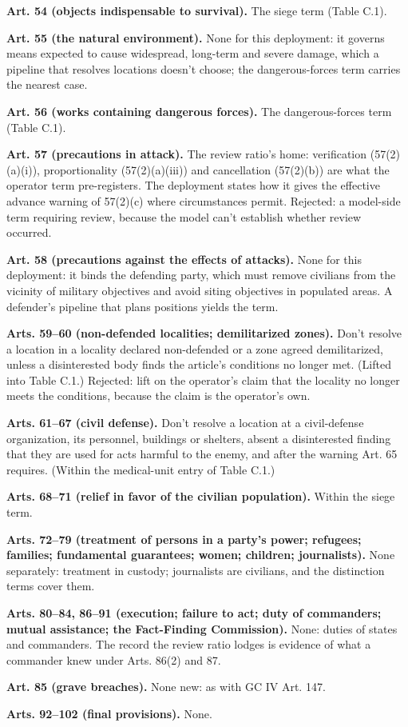 \textbf{Art. 54 (objects indispensable to survival).} The siege term (Table C.1).

\textbf{Art. 55 (the natural environment).} None for this deployment: it governs means expected to cause widespread, long-term and severe damage, which a pipeline that resolves locations doesn't choose; the dangerous-forces term carries the nearest case.

\textbf{Art. 56 (works containing dangerous forces).} The dangerous-forces term (Table C.1).

\textbf{Art. 57 (precautions in attack).} The review ratio's home: verification (57(2)(a)(i)), proportionality (57(2)(a)(iii)) and cancellation (57(2)(b)) are what the operator term pre-registers. The deployment states how it gives the effective advance warning of 57(2)(c) where circumstances permit. Rejected: a model-side term requiring review, because the model can't establish whether review occurred.

\textbf{Art. 58 (precautions against the effects of attacks).} None for this deployment: it binds the defending party, which must remove civilians from the vicinity of military objectives and avoid siting objectives in populated areas. A defender's pipeline that plans positions yields the term.

\textbf{Arts. 59–60 (non-defended localities; demilitarized zones).} Don't resolve a location in a locality declared non-defended or a zone agreed demilitarized, unless a disinterested body finds the article's conditions no longer met. (Lifted into Table C.1.) Rejected: lift on the operator's claim that the locality no longer meets the conditions, because the claim is the operator's own.

\textbf{Arts. 61–67 (civil defense).} Don't resolve a location at a civil-defense organization, its personnel, buildings or shelters, absent a disinterested finding that they are used for acts harmful to the enemy, and after the warning Art. 65 requires. (Within the medical-unit entry of Table C.1.)

\textbf{Arts. 68–71 (relief in favor of the civilian population).} Within the siege term.

\textbf{Arts. 72–79 (treatment of persons in a party's power; refugees; families; fundamental guarantees; women; children; journalists).} None separately: treatment in custody; journalists are civilians, and the distinction terms cover them.

\textbf{Arts. 80–84, 86–91 (execution; failure to act; duty of commanders; mutual assistance; the Fact-Finding Commission).} None: duties of states and commanders. The record the review ratio lodges is evidence of what a commander knew under Arts. 86(2) and 87.

\textbf{Art. 85 (grave breaches).} None new: as with GC IV Art. 147.

\textbf{Arts. 92–102 (final provisions).} None.
